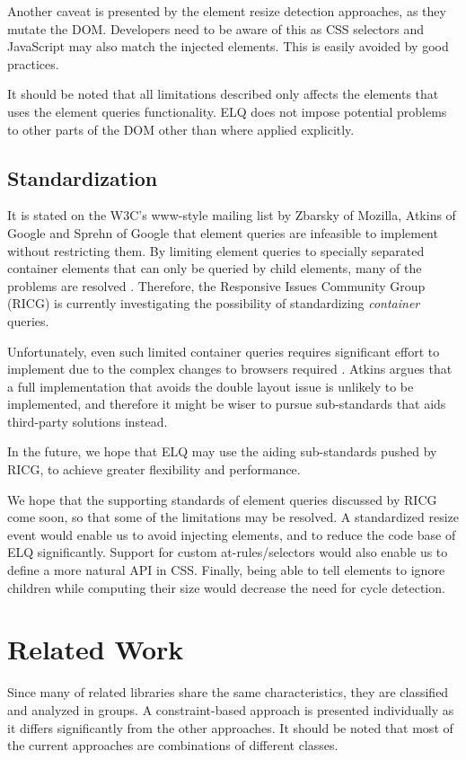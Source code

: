 \documentclass{acm_proc_article-sp}
\newcommand{\elq}{ELQ}
\begin{document}
    Another caveat is presented by the element resize detection approaches, as they mutate the DOM.
    Developers need to be aware of this as CSS selectors and JavaScript may also match the injected elements.
    This is easily avoided by good practices.

    It should be noted that all limitations described only affects the elements that uses the element queries functionality.
    \elq{} does not impose potential problems to other parts of the DOM other than where applied explicitly.

  \subsection{Standardization}
    It is stated on the W3C's www-style mailing list \cite{w3c_eq_mail} by Zbarsky of Mozilla, Atkins of Google and Sprehn of Google that element queries are infeasible to implement without restricting them.
    By limiting element queries to specially separated container elements that can only be queried by child elements, many of the problems are resolved \cite{ricg_irc_log,ricg_issue_viewport}.
    Therefore, the Responsive Issues Community Group (RICG) is currently investigating the possibility of standardizing \emph{container} queries.

    Unfortunately, even such limited container queries requires significant effort to implement due to the complex changes to browsers required \cite{ricg_issue_viewport}.
    Atkins argues that a full implementation that avoids the double layout issue is unlikely to be implemented, and therefore it might be wiser to pursue sub-standards that aids third-party solutions instead.
   
    In the future, we hope that \elq{} may use the aiding sub-standards pushed by RICG, to achieve greater flexibility and performance.

    We hope that the supporting standards of element queries discussed by RICG come soon, so that some of the limitations may be resolved.
    A standardized resize event would enable us to avoid injecting elements, and to reduce the code base of \elq{} significantly.
    Support for custom at-rules/selectors would also enable us to define a more natural API in CSS.
    Finally, being able to tell elements to ignore children while computing their size would decrease the need for cycle detection.


\section{Related Work}\label{sec:related}
  Since many of related libraries share the same characteristics, they are classified and analyzed in groups.
  A constraint-based approach is presented individually as it differs significantly from the other approaches.
  It should be noted that most of the current approaches are combinations of different classes.
\end{document}
